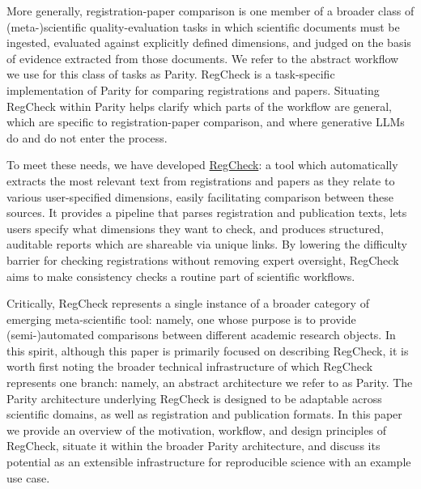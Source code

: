 \documentclass{article}
\begin{document}
More generally, registration-paper comparison is one member of a broader class of (meta-)scientific quality-evaluation tasks in which scientific documents must be ingested, evaluated against explicitly defined dimensions, and judged on the basis of evidence extracted from those documents. We refer to the abstract workflow we use for this class of tasks as Parity. RegCheck is a task-specific implementation of Parity for comparing registrations and papers. Situating RegCheck within Parity helps clarify which parts of the workflow are general, which are specific to registration-paper comparison, and where generative LLMs do and do not enter the process.

To meet these needs, we have developed \href{https://regcheck.app}{RegCheck}: a tool which automatically extracts the most relevant text from registrations and papers as they relate to various user-specified dimensions, easily facilitating comparison between these sources. It provides a pipeline that parses registration and publication texts, lets users specify what dimensions they want to check, and produces structured, auditable reports which are shareable via unique links. By lowering the difficulty barrier for checking registrations without removing expert oversight, RegCheck aims to make consistency checks a routine part of scientific workflows.

Critically, RegCheck represents a single instance of a broader category of emerging meta-scientific tool: namely, one whose purpose is to provide (semi-)automated comparisons between different academic research objects. In this spirit, although this paper is primarily focused on describing RegCheck, it is worth first noting the broader technical infrastructure of which RegCheck represents one branch: namely, an abstract architecture we refer to as Parity. The Parity architecture underlying RegCheck is designed to be adaptable across scientific domains, as well as registration and publication formats. In this paper we provide an overview of the motivation, workflow, and design principles of RegCheck, situate it within the broader Parity architecture, and discuss its potential as an extensible infrastructure for reproducible science with an example use case.
\end{document}
